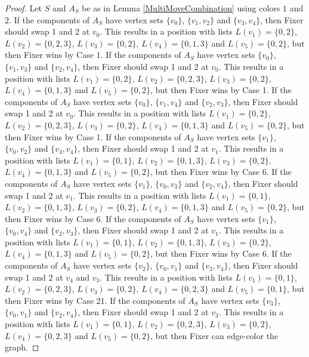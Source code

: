 \documentclass[12pt]{amsart}
\theoremstyle{plain}
\theoremstyle{definition}
\theoremstyle{remark}
\begin{document}
\begin{proof}
Let $S$ and $A_S$ be as in Lemma \ref{MultiMoveCombination} using colors $1$ and $2$. If the components of $A_S$ have vertex sets $\{v_0\}$, $\{v_1, v_2\}$ and $\{v_3, v_4\}$, then Fixer should swap 1 and 2 at $v_0$. This results in a position with lists $L(v_1) = \{0, 2\}$, $L(v_2) = \{0, 2, 3\}$, $L(v_3) = \{0, 2\}$, $L(v_4) = \{0, 1, 3\}$ and $L(v_5) = \{0, 2\}$, but then Fixer wins by Case 1.
If the components of $A_S$ have vertex sets $\{v_0\}$, $\{v_1, v_3\}$ and $\{v_2, v_4\}$, then Fixer should swap 1 and 2 at $v_0$. This results in a position with lists $L(v_1) = \{0, 2\}$, $L(v_2) = \{0, 2, 3\}$, $L(v_3) = \{0, 2\}$, $L(v_4) = \{0, 1, 3\}$ and $L(v_5) = \{0, 2\}$, but then Fixer wins by Case 1.
If the components of $A_S$ have vertex sets $\{v_0\}$, $\{v_1, v_4\}$ and $\{v_2, v_3\}$, then Fixer should swap 1 and 2 at $v_0$. This results in a position with lists $L(v_1) = \{0, 2\}$, $L(v_2) = \{0, 2, 3\}$, $L(v_3) = \{0, 2\}$, $L(v_4) = \{0, 1, 3\}$ and $L(v_5) = \{0, 2\}$, but then Fixer wins by Case 1.
If the components of $A_S$ have vertex sets $\{v_1\}$, $\{v_0, v_2\}$ and $\{v_3, v_4\}$, then Fixer should swap 1 and 2 at $v_1$. This results in a position with lists $L(v_1) = \{0, 1\}$, $L(v_2) = \{0, 1, 3\}$, $L(v_3) = \{0, 2\}$, $L(v_4) = \{0, 1, 3\}$ and $L(v_5) = \{0, 2\}$, but then Fixer wins by Case 6.
If the components of $A_S$ have vertex sets $\{v_1\}$, $\{v_0, v_3\}$ and $\{v_2, v_4\}$, then Fixer should swap 1 and 2 at $v_1$. This results in a position with lists $L(v_1) = \{0, 1\}$, $L(v_2) = \{0, 1, 3\}$, $L(v_3) = \{0, 2\}$, $L(v_4) = \{0, 1, 3\}$ and $L(v_5) = \{0, 2\}$, but then Fixer wins by Case 6.
If the components of $A_S$ have vertex sets $\{v_1\}$, $\{v_0, v_4\}$ and $\{v_2, v_3\}$, then Fixer should swap 1 and 2 at $v_1$. This results in a position with lists $L(v_1) = \{0, 1\}$, $L(v_2) = \{0, 1, 3\}$, $L(v_3) = \{0, 2\}$, $L(v_4) = \{0, 1, 3\}$ and $L(v_5) = \{0, 2\}$, but then Fixer wins by Case 6.
If the components of $A_S$ have vertex sets $\{v_2\}$, $\{v_0, v_1\}$ and $\{v_3, v_4\}$, then Fixer should swap 1 and 2 at $v_4$ and $v_3$. This results in a position with lists $L(v_1) = \{0, 1\}$, $L(v_2) = \{0, 2, 3\}$, $L(v_3) = \{0, 2\}$, $L(v_4) = \{0, 2, 3\}$ and $L(v_5) = \{0, 1\}$, but then Fixer wins by Case 21.
If the components of $A_S$ have vertex sets $\{v_3\}$, $\{v_0, v_1\}$ and $\{v_2, v_4\}$, then Fixer should swap 1 and 2 at $v_3$. This results in a position with lists $L(v_1) = \{0, 1\}$, $L(v_2) = \{0, 2, 3\}$, $L(v_3) = \{0, 2\}$, $L(v_4) = \{0, 2, 3\}$ and $L(v_5) = \{0, 2\}$, but then Fixer can edge-color the graph.

\end{proof}
\end{document}

